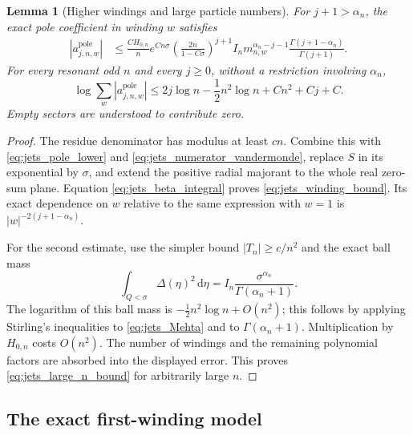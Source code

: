 \documentclass[11pt]{article}
\numberwithin{equation}{section}
\newtheorem{lemma}[theorem]{Lemma}
\theoremstyle{definition}
\newcommand{\dd}{\,\mathrm d}
\begin{document}
\begin{lemma}[Higher windings and large particle numbers]
\label{lem:jets_windings_large_n}
For $j+1>\alpha_n$, the exact pole coefficient in winding $w$
satisfies
\begin{align}
 |a_{j,n,w}^{\mathrm{pole}}|
 &\le \frac{C H_{0,n}}n e^{Cn\sigma}
 \left(\frac{2n}{1-C\sigma}\right)^{j+1}
 I_n m_{n,w}^{\alpha_n-j-1}
 \frac{\Gamma(j+1-\alpha_n)}{\Gamma(j+1)}.
 \label{eq:jets_winding_bound}
\end{align}
For every resonant odd $n$ and every $j\ge0$, without a restriction
involving $\alpha_n$,
\begin{equation}\label{eq:jets_large_n_bound}
 \log\sum_w|a_{j,n,w}^{\mathrm{pole}}|
 \le 2j\log n-\frac12n^2\log n+Cn^2+Cj+C.
\end{equation}
Empty sectors are understood to contribute zero.
\end{lemma}

\begin{proof}
The residue denominator has modulus at least $cn$. Combine this
with \eqref{eq:jets_pole_lower} and
\eqref{eq:jets_numerator_vandermonde}, replace $S$ in its exponential
by $\sigma$, and extend the positive radial majorant to the whole
real zero-sum plane. Equation \eqref{eq:jets_beta_integral} proves
\eqref{eq:jets_winding_bound}. Its exact dependence on $w$ relative
to the same expression with $w=1$ is
$|w|^{-2(j+1-\alpha_n)}$.

For the second estimate, use the simpler bound $|T_n|\ge c/n^2$
and the exact ball mass
\[
 \int_{Q<\sigma}\Delta(\eta)^2\dd\eta
 =I_n\frac{\sigma^{\alpha_n}}{\Gamma(\alpha_n+1)}.
\]
The logarithm of this ball mass is
$-\tfrac12n^2\log n+O(n^2)$; this follows by applying Stirling's
inequalities to \eqref{eq:jets_Mehta} and to
$\Gamma(\alpha_n+1)$. Multiplication by $H_{0,n}$ costs $O(n^2)$.
The number of windings and the remaining polynomial factors are
absorbed into the displayed error. This proves
\eqref{eq:jets_large_n_bound} for arbitrarily large $n$.
\end{proof}

\subsection{The exact first-winding model}
\end{document}
